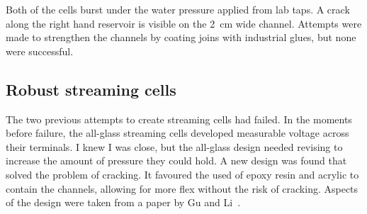     Both of the cells burst under the water pressure applied from lab taps.
    A crack along the right hand reservoir is visible on the \SI{2}{\centi\meter} wide channel.
    Attempts were made to strengthen the channels by coating joins with industrial glues, but none were successful.


  \subsection{Robust streaming cells}


    The two previous attempts to create streaming cells had failed.
    In the moments before failure, the all-glass streaming cells developed measurable voltage across their terminals.
    I knew I was close, but the all-glass design needed revising to increase the amount of pressure they could hold.
    A new design was found that solved the problem of cracking.
    It favoured the used of epoxy resin and acrylic to contain the channels, allowing for more flex without the risk of cracking.
    Aspects of the design were taken from a paper by Gu and Li~\cite{Gu2000}.

